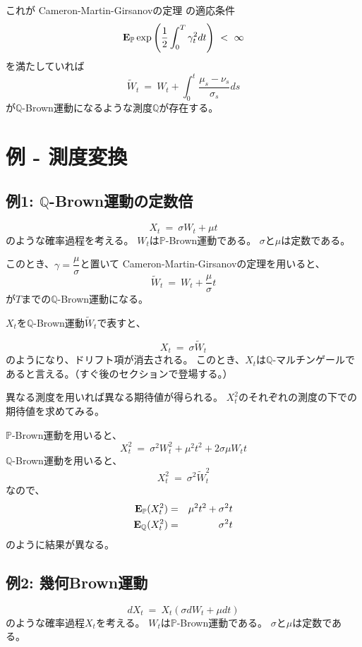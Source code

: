 \documentclass[uplatex,a4j,12pt,dvipdfmx]{jsarticle}
\begin{document}
これが
Cameron-Martin-Girsanovの定理
の適応条件
$$
	{\bf E}_{\mathbb{P}} \exp \left( \dfrac{1}{2} \int^{T}_{0} \gamma_{t}^{2} dt \right)
	\ < \
	\infty
$$
を満たしていれば
$$
	\tilde{W}_{t}
	\ = \
	W_{t}
	+
	\int^{t}_{0}
	\dfrac{ \mu_{s} - \nu_{s} }{\sigma_{s}}
	ds
$$
が$\mathbb{Q}$-Brown運動になるような測度$\mathbb{Q}$が存在する。
\section{例 - 測度変換}

\subsection{例1: $\mathbb{Q}$-Brown運動の定数倍}

$$
	X_{t}
	\ = \
	\sigma W_{t}
	+
	\mu t
$$
のような確率過程を考える。
$W_{t}$は$\mathbb{P}$-Brown運動である。
$\sigma$と$\mu$は定数である。

このとき、$\gamma = \dfrac{\mu}{\sigma}$と置いて
Cameron-Martin-Girsanovの定理を用いると、
$$
	\tilde{W}_{t}
	\ = \
	W_{t}
	+
	\dfrac{\mu}{\sigma} t
$$
が$T$までの$\mathbb{Q}$-Brown運動になる。

$X_{t}$を$\mathbb{Q}$-Brown運動$\tilde{W}_{t}$で表すと、

$$
	X_{t}
	\ = \
	\sigma \tilde{W}_{t}
$$
のようになり、ドリフト項が消去される。
このとき、$X_{t}$は$\mathbb{Q}$-マルチンゲールであると言える。（すぐ後のセクションで登場する。）
${}$

異なる測度を用いれば異なる期待値が得られる。
$X_{t}^{2}$のそれぞれの測度の下での期待値を求めてみる。

$\mathbb{P}$-Brown運動を用いると、
$$
	X^{2}_{t}
	\ = \
	\sigma^{2} W^{2}_{t}
	+
	\mu^{2} t^{2}
	+ 2 \sigma \mu W_{t} t
$$
$\mathbb{Q}$-Brown運動を用いると、
$$
	X^{2}_{t}
	\ = \
	\sigma^{2} \tilde{W}^{2}_{t}
$$
なので、
%
\begin{eqnarray*}
	{\bf E}_{\mathbb{P}} (X^{2}_{t})
	&=&
	\mu^{2} t^{2}
	+
	\sigma^{2} t
	\\
	{\bf E}_{\mathbb{Q}} (X^{2}_{t})
	&=&
	\sigma^{2} t
\end{eqnarray*}
%
のように結果が異なる。
\subsection{例2: 幾何Brown運動}

$$
	d X_{t}
	\ = \
	X_{t}
	(
	\sigma dW_{t}
	+
	\mu dt
	)
$$
のような確率過程$X_{t}$を考える。
$W_{t}$は$\mathbb{P}$-Brown運動である。
$\sigma$と$\mu$は定数である。
\end{document}
